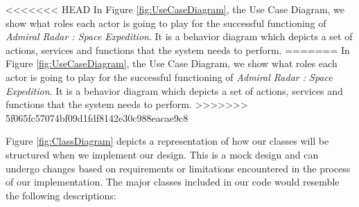 
<<<<<<< HEAD
In Figure \ref{fig:UseCaseDiagram}, the Use Case Diagram, we show what roles each actor is going to play for the successful functioning of \textit{Admiral Radar : Space Expedition}. It is a behavior diagram which depicts a set of actions, services and functions that the system needs to perform.
=======
In Figure \ref{fig:UseCaseDiagram}, the Use Case Diagram, we show what roles each actor is going to play for the successful functioning of \textit{Admiral Radar : Space Expedition}. It is a behavior diagram which depicts a set of actions, services and functions that the system needs to perform.
>>>>>>> 5f065fc57074bf09d1fdf8142e30c988eacae9c8


Figure \ref{fig:ClassDiagram} depicts a representation of how our classes will be structured when we implement our design. This is a mock design and can undergo changes based on requirements or limitations encountered in the process of our implementation. The major classes included in our code would resemble the following descriptions: 

